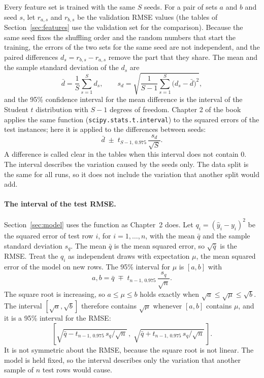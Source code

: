 Every feature set is trained with the same $S$ seeds. For a pair of sets $a$ and $b$ and seed $s$, let $r_{a,s}$ and $r_{b,s}$ be the validation RMSE values (the tables of Section~\ref{sec:features} use the validation set for the comparison). Because the same seed fixes the shuffling order and the random numbers that start the training, the errors of the two sets for the same seed are not independent, and the paired differences $d_s = r_{b,s} - r_{a,s}$ remove the part that they share. The mean and the sample standard deviation of the $d_s$ are
\begin{equation}
\bar d = \frac{1}{S}\sum_{s=1}^{S} d_s ,
\qquad
s_d = \sqrt{\frac{1}{S-1}\sum_{s=1}^{S} \bigl(d_s - \bar d\bigr)^2} ,
\end{equation}
and the 95\% confidence interval for the mean difference is the interval of the Student $t$ distribution with $S-1$ degrees of freedom. Chapter 2 of the book applies the same function (\texttt{scipy.stats.t.interval}) to the squared errors of the test instances; here it is applied to the differences between seeds:
\begin{equation}
\bar d \;\pm\; t_{S-1,\,0.975}\,\frac{s_d}{\sqrt{S}} .
\end{equation}
A difference is called clear in the tables when this interval does not contain 0. The interval describes the variation caused by the seeds only. The data split is the same for all runs, so it does not include the variation that another split would add.

\paragraph{The interval of the test RMSE.} Section~\ref{sec:model} uses the function as Chapter~2 does. Let $q_i = (\hat y_i - y_i)^2$ be the squared error of test row $i$, for $i = 1, \dots, n$, with the mean $\bar q$ and the sample standard deviation $s_q$. The mean $\bar q$ is the mean squared error, so $\sqrt{\bar q}$ is the RMSE. Treat the $q_i$ as independent draws with expectation $\mu$, the mean squared error of the model on new rows. The 95\% interval for $\mu$ is $[a, b]$ with
\begin{equation}
a, b = \bar q \;\mp\; t_{n-1,\,0.975}\,\frac{s_q}{\sqrt{n}} .
\end{equation}
The square root is increasing, so $a \le \mu \le b$ holds exactly when $\sqrt{a} \le \sqrt{\mu} \le \sqrt{b}$. The interval $[\sqrt{a}, \sqrt{b}]$ therefore contains $\sqrt{\mu}$ whenever $[a, b]$ contains $\mu$, and it is a 95\% interval for the RMSE:
\begin{equation}
\left[\sqrt{\bar q - t_{n-1,\,0.975}\,s_q/\sqrt{n}}\,,\; \sqrt{\bar q + t_{n-1,\,0.975}\,s_q/\sqrt{n}}\,\right] .
\end{equation}
It is not symmetric about the RMSE, because the square root is not linear. The model is held fixed, so the interval describes only the variation that another sample of $n$ test rows would cause.
